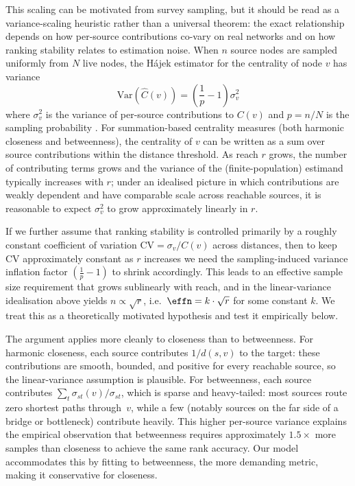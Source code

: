 This scaling can be motivated from survey sampling, but it should be read as a variance-scaling heuristic rather than a universal theorem: the exact relationship depends on how per-source contributions co-vary on real networks and on how ranking stability relates to estimation noise. When $n$ source nodes are sampled uniformly from $N$ live nodes, the H\'{a}jek estimator \citep{Hajek1971} for the centrality of node $v$ has variance
\begin{equation}
  \text{Var}(\hat{C}(v)) = \left(\frac{1}{p} - 1\right) \sigma^2_v
  \label{eq:hajek_var}
\end{equation}
where $\sigma^2_v$ is the variance of per-source contributions to $C(v)$ and $p = n/N$ is the sampling probability \citep{Cochran1977, Sarndal2003}. For summation-based centrality measures (both harmonic closeness and betweenness), the centrality of $v$ can be written as a sum over source contributions within the distance threshold. As reach $r$ grows, the number of contributing terms grows and the variance of the (finite-population) estimand typically increases with $r$; under an idealised picture in which contributions are weakly dependent and have comparable scale across reachable sources, it is reasonable to expect $\sigma^2_v$ to grow approximately linearly in $r$.

If we further assume that ranking stability is controlled primarily by a roughly constant coefficient of variation $\text{CV} = \sigma_v / C(v)$ across distances, then to keep CV approximately constant as $r$ increases we need the sampling-induced variance inflation factor $\left(\tfrac{1}{p} - 1\right)$ to shrink accordingly. This leads to an effective sample size requirement that grows sublinearly with reach, and in the linear-variance idealisation above yields $n \propto \sqrt{r}$, i.e.\ $\effn = k \cdot \sqrt{r}$ for some constant $k$. We treat this as a theoretically motivated hypothesis and test it empirically below.

The argument applies more cleanly to closeness than to betweenness. For harmonic closeness, each source contributes $1/d(s,v)$ to the target: these contributions are smooth, bounded, and positive for every reachable source, so the linear-variance assumption is plausible. For betweenness, each source contributes $\sum_t \sigma_{st}(v)/\sigma_{st}$, which is sparse and heavy-tailed: most sources route zero shortest paths through~$v$, while a few (notably sources on the far side of a bridge or bottleneck) contribute heavily. This higher per-source variance explains the empirical observation that betweenness requires approximately $1.5\times$ more samples than closeness to achieve the same rank accuracy. Our model accommodates this by fitting to betweenness, the more demanding metric, making it conservative for closeness.

